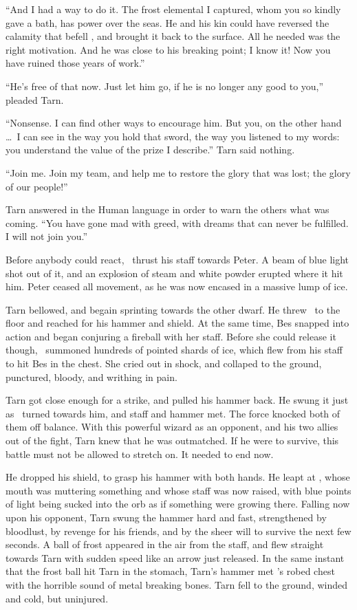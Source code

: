 ``And I had a way to do it.  The frost elemental I captured, whom you so kindly gave a bath, has power over the seas.  He and his kin could have reversed the calamity that befell \valdunmir, and brought it back to the surface.  All he needed was the right motivation.  And he was close to his breaking point; I know it!  Now you have ruined those years of work.''

``He's free of that now.  Just let him go, if he is no longer any good to you,'' pleaded Tarn.

``Nonsense.  I can find other ways to encourage him.  But you, on the other hand \ldots\ I can see in the way you hold that sword, the way you listened to my words: you understand the value of the prize I describe.''  Tarn said nothing.

``Join me.  Join my team, and help me to restore the glory that was lost; the glory of our people!''

Tarn answered in the Human language in order to warn the others what was coming.  ``You have gone mad with greed, with dreams that can never be fulfilled.  I will not join you.''

Before anybody could react, \mothzam\ thrust his staff towards Peter.  A beam of blue light shot out of it, and an explosion of steam and white powder erupted where it hit him.  Peter ceased all movement, as he was now encased in a massive lump of ice.

Tarn bellowed, and begain sprinting towards the other dwarf.  He threw \kildir\ to the floor and reached for his hammer and shield.  At the same time, Bes snapped into action and began conjuring a fireball with her staff.  Before she could release it though, \mothzam\ summoned hundreds of pointed shards of ice, which flew from his staff to hit Bes in the chest.  She cried out in shock, and collaped to the ground, punctured, bloody, and writhing in pain.

Tarn got close enough for a strike, and pulled his hammer back.  He swung it just as \mothzam\ turned towards him, and staff and hammer met.  The force knocked both of them off balance.  With this powerful wizard as an opponent, and his two allies out of the fight, Tarn knew that he was outmatched.  If he were to survive, this battle must not be allowed to stretch on.  It needed to end now.

He dropped his shield, to grasp his hammer with both hands.  He leapt at \mothzam, whose mouth was muttering something and whose staff was now raised, with blue points of light being sucked into the orb as if something were growing there.  Falling now upon his opponent, Tarn swung the hammer hard and fast, strengthened by bloodlust, by revenge for his friends, and by the sheer will to survive the next few seconds.  A ball of frost appeared in the air from the staff, and flew straight towards Tarn with sudden speed like an arrow just released.  In the same instant that the frost ball hit Tarn in the stomach, Tarn's hammer met \mothzam's robed chest with the horrible sound of metal breaking bones.  Tarn fell to the ground, winded and cold, but uninjured.

